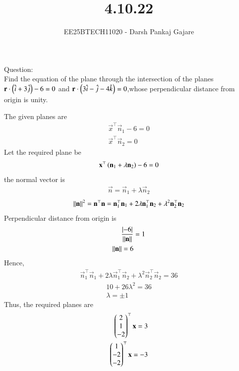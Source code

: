 \documentclass[journal,12pt,onecolumn]{IEEEtran}
\begin{document}
\title{4.10.22}
\author{EE25BTECH11020 - Darsh Pankaj Gajare}
{\let\newpage\relax\maketitle}
Question:\\
Find the equation of the plane through the intersection of the planes $\mathbf{r}\cdot\left(\hat{i}+3\hat{j}\right)-6=0$ and $\mathbf{r}\cdot\left(3\hat{i}-\hat{j}-4\hat{k}\right)=0$,whose perpendicular distance from origin is unity.\\
\solution
\begin{table}[H]
	\centering
	\caption{}
	
	\label{}
\end{table}
\solution
The given planes are
\begin{align}
\vec{x}^\top\vec{n}_1 - 6 = 0 \\
\vec{x}^\top\vec{n}_2 = 0
\end{align}
Let the required plane be
\begin{align}
\mathbf{x}^\top\left(\mathbf{n}_1 + \lambda\mathbf{n}_2\right) - 6 = 0
\end{align}
the normal vector is
\begin{align}
\vec{n} = \vec{n}_1 + \lambda\vec{n}_2
\end{align}
\begin{align}
\left\lVert\mathbf{n}\right\rVert^2 = \mathbf{n}^\top\mathbf{n}= \mathbf{n}_1^\top\mathbf{n}_1 + 2\lambda\mathbf{n}_1^\top\mathbf{n}_2 + \lambda^2 \mathbf{n}_2^\top\mathbf{n}_2
\end{align}
Perpendicular distance from origin is
\begin{align}
\frac{\left\vert-6\right\vert}{\left\lVert\mathbf{n}\right\rVert} &= 1 \\
\left\lVert\mathbf{n}\right\rVert = 6
\end{align}
Hence,
\begin{align}
\vec{n}_1^\top\vec{n}_1 + 2\lambda\vec{n}_1^\top\vec{n}_2 + \lambda^2 \vec{n}_2^\top\vec{n}_2 = 36
\end{align}
\begin{align}
10 + 26\lambda^2 = 36 \\
\lambda = \pm 1
\end{align}
Thus, the required planes are
\begin{align}
	\begin{pmatrix}2\\1\\-2\end{pmatrix}^\top\mathbf{x}=3\\
	\begin{pmatrix}1\\-2\\-2\end{pmatrix}^\top\mathbf{x}=-3
\end{align}
\end{document}
